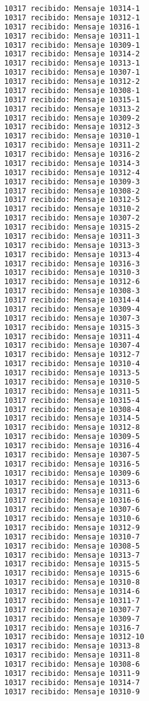 \begin{lstlisting}[language=bash, style=CodeStyle, caption=diez productores y un consumidor, label=lst:10producidor1producidor]
10317 recibido: Mensaje 10314-1
10317 recibido: Mensaje 10312-1
10317 recibido: Mensaje 10316-1
10317 recibido: Mensaje 10311-1
10317 recibido: Mensaje 10309-1
10317 recibido: Mensaje 10314-2
10317 recibido: Mensaje 10313-1
10317 recibido: Mensaje 10307-1
10317 recibido: Mensaje 10312-2
10317 recibido: Mensaje 10308-1
10317 recibido: Mensaje 10315-1
10317 recibido: Mensaje 10313-2
10317 recibido: Mensaje 10309-2
10317 recibido: Mensaje 10312-3
10317 recibido: Mensaje 10310-1
10317 recibido: Mensaje 10311-2
10317 recibido: Mensaje 10316-2
10317 recibido: Mensaje 10314-3
10317 recibido: Mensaje 10312-4
10317 recibido: Mensaje 10309-3
10317 recibido: Mensaje 10308-2
10317 recibido: Mensaje 10312-5
10317 recibido: Mensaje 10310-2
10317 recibido: Mensaje 10307-2
10317 recibido: Mensaje 10315-2
10317 recibido: Mensaje 10311-3
10317 recibido: Mensaje 10313-3
10317 recibido: Mensaje 10313-4
10317 recibido: Mensaje 10316-3
10317 recibido: Mensaje 10310-3
10317 recibido: Mensaje 10312-6
10317 recibido: Mensaje 10308-3
10317 recibido: Mensaje 10314-4
10317 recibido: Mensaje 10309-4
10317 recibido: Mensaje 10307-3
10317 recibido: Mensaje 10315-3
10317 recibido: Mensaje 10311-4
10317 recibido: Mensaje 10307-4
10317 recibido: Mensaje 10312-7
10317 recibido: Mensaje 10310-4
10317 recibido: Mensaje 10313-5
10317 recibido: Mensaje 10310-5
10317 recibido: Mensaje 10311-5
10317 recibido: Mensaje 10315-4
10317 recibido: Mensaje 10308-4
10317 recibido: Mensaje 10314-5
10317 recibido: Mensaje 10312-8
10317 recibido: Mensaje 10309-5
10317 recibido: Mensaje 10316-4
10317 recibido: Mensaje 10307-5
10317 recibido: Mensaje 10316-5
10317 recibido: Mensaje 10309-6
10317 recibido: Mensaje 10313-6
10317 recibido: Mensaje 10311-6
10317 recibido: Mensaje 10316-6
10317 recibido: Mensaje 10307-6
10317 recibido: Mensaje 10310-6
10317 recibido: Mensaje 10312-9
10317 recibido: Mensaje 10310-7
10317 recibido: Mensaje 10308-5
10317 recibido: Mensaje 10313-7
10317 recibido: Mensaje 10315-5
10317 recibido: Mensaje 10315-6
10317 recibido: Mensaje 10310-8
10317 recibido: Mensaje 10314-6
10317 recibido: Mensaje 10311-7
10317 recibido: Mensaje 10307-7
10317 recibido: Mensaje 10309-7
10317 recibido: Mensaje 10316-7
10317 recibido: Mensaje 10312-10
10317 recibido: Mensaje 10313-8
10317 recibido: Mensaje 10311-8
10317 recibido: Mensaje 10308-6
10317 recibido: Mensaje 10311-9
10317 recibido: Mensaje 10314-7
10317 recibido: Mensaje 10310-9

\end{lstlisting}
